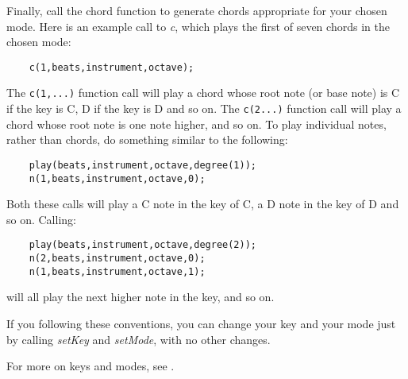 \documentclass{article}
\begin{document}
Finally, call the chord function to generate
chords appropriate for your chosen mode. Here is
an example call to {\it c}, which plays the first
of seven chords in the chosen mode:

\begin{verbatim}
    c(1,beats,instrument,octave);
\end{verbatim}

The \verb!c(1,...)! function call will play a chord whose root note (or
base note) is C if the key is C, D if the key is D
and so on. The \verb!c(2...)! function call will play a chord whose
root note is one note higher, and so on.
To play individual notes, rather than chords, do something
similar to the following:

\begin{verbatim}
    play(beats,instrument,octave,degree(1));
    n(1,beats,instrument,octave,0);
\end{verbatim}

Both these calls will play a C note in the key of C, a D note
in the key of D and so on. Calling:

\begin{verbatim}
    play(beats,instrument,octave,degree(2));
    n(2,beats,instrument,octave,0);
    n(1,beats,instrument,octave,1);
\end{verbatim}

will all play the next higher note in the key, and so on.

If you following these conventions, you can change
your key and your mode just by calling {\it setKey} and
{\it setMode}, with no other changes.

For more on keys and modes, see .
\end{document}
